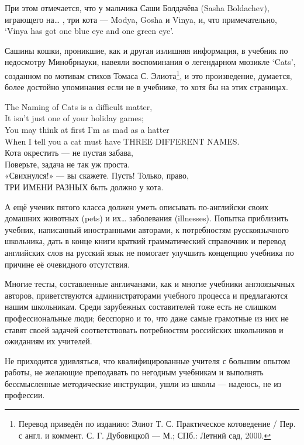 При этом отмечается, что у мальчика Саши Болдачёва (Sasha Boldachev), играющего на… , три кота — Modya, Gosha и Vinya, и, что примечательно, `Vinya has got one blue eye and one green eye'.

Сашины кошки, проникшие, как и другая излишняя информация, в учебник по недосмотру Минобрнауки, навеяли воспоминания о легендарном мюзикле ‘Cats’, созданном по мотивам стихов Томаса С. Элиота\footnote{Перевод приведён по изданию: Элиот Т. С. Практическое котоведение / Пер. с англ. и коммент. С. Г. Дубовицкой — М.; СПб.: Летний сад, 2000.}, и это произведение, думается, более достойно упоминания если не в учебнике, то хотя бы на этих страницах.

\begin{center}
    The Naming of Cats is a difficult matter,\\
    It isn't just one of your holiday games;\\
    You may think at first I'm as mad as a hatter\\
    When I tell you a cat must have THREE DIFFERENT NAMES.\\[1em]

    Кота окрестить --- не пустая забава,\\
    Поверьте, задача не так уж проста.\\
    «Свихнулся!» --- вы скажете.
    Пусть! Только, право,\\
    ТРИ ИМЕНИ РАЗНЫХ быть должно у кота.
\end{center}

А ещё ученик пятого класса должен уметь описывать по-английски своих домашних животных (pets) и их… заболевания (illnesses). Попытка приблизить учебник, написанный иностранными авторами, к потребностям русскоязычного школьника, дать в конце книги краткий грамматический справочник и перевод английских слов на русский язык не помогает улучшить концепцию учебника по причине её очевидного отсутствия.

Многие тесты, составленные англичанами, как и многие учебники англоязычных авторов, приветствуются администраторами учебного процесса и предлагаются нашим школьникам. Среди зарубежных составителей тоже есть не слишком профессиональные люди; бесспорно и то, что даже самые грамотные из них не ставят своей задачей соответствовать потребностям российских школьников и ожиданиям их учителей.


Не приходится удивляться, что квалифицированные учителя с большим опытом работы, не желающие преподавать по негодным учебникам и выполнять бессмысленные методические инструкции, ушли из школы — надеюсь, не из профессии.

